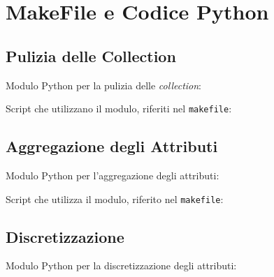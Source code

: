 \begin{appendices}
\label{appendix}
\chapter{MakeFile e Codice Python}

    \section{Pulizia delle Collection}
    \label{appendix:cleanings}

        Modulo Python per la pulizia delle \textit{collection}: \\
        

        \vspace{0.8 cm}

        Script che utilizzano il modulo, riferiti nel \texttt{makefile}: \\
        
        

    \section{Aggregazione degli Attributi}
    \label{appendix:aggregs}

        Modulo Python per l'aggregazione degli attributi: \\
        

        \vspace{0.8 cm}

        Script che utilizza il modulo, riferito nel \texttt{makefile}: \\
        
        

    \section{Discretizzazione}
    \label{appendix:discretize}

        Modulo Python per la discretizzazione degli attributi: \\
        


\end{appendices}
